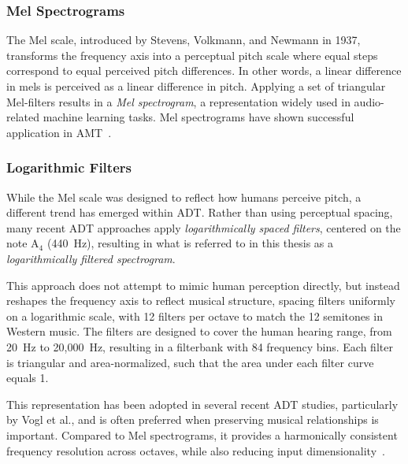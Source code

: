 \subsubsection{Mel Spectrograms}

The Mel scale, introduced by Stevens, Volkmann, and Newmann in 1937, transforms the frequency axis into a perceptual pitch scale where equal steps correspond to equal perceived pitch differences. In other words, a linear difference in mels is perceived as a linear difference in pitch. Applying a set of triangular Mel-filters results in a \textit{Mel spectrogram}, a representation widely used in audio-related machine learning tasks. Mel spectrograms have shown successful application in \gls{AMT}~\cite{gardner2022mt3multitaskmultitrackmusic, chang2024yourmt3+, gong2021astaudiospectrogramtransformer, wolfmonheim2024spectralrhythmfeaturesaudio, 8350302}.

\subsubsection{Logarithmic Filters}

While the Mel scale was designed to reflect how humans perceive pitch, a different trend has emerged within \acrfull{ADT}. Rather than using perceptual spacing, many recent \gls{ADT} approaches apply \textit{logarithmically spaced filters}, centered on the note $\text{A}_4$ (440~Hz), resulting in what is referred to in this thesis as a \textit{logarithmically filtered spectrogram}. 

This approach does not attempt to mimic human perception directly, but instead reshapes the frequency axis to reflect musical structure, spacing filters uniformly on a logarithmic scale, with 12 filters per octave to match the 12 semitones in Western music. The filters are designed to cover the human hearing range, from 20~Hz to 20,000~Hz, resulting in a filterbank with 84 frequency bins. Each filter is triangular and area-normalized, such that the area under each filter curve equals 1.

This representation has been adopted in several recent \gls{ADT} studies, particularly by Vogl et al., and is often preferred when preserving musical relationships is important. Compared to Mel spectrograms, it provides a harmonically consistent frequency resolution across octaves, while also reducing input dimensionality~\cite{Vogl2017DrumTV, vogl2018multiinstrumentdrumtranscription, jia2019deep, signals4040042, zehren2024analyzingreducingsynthetictorealtransfer}.

